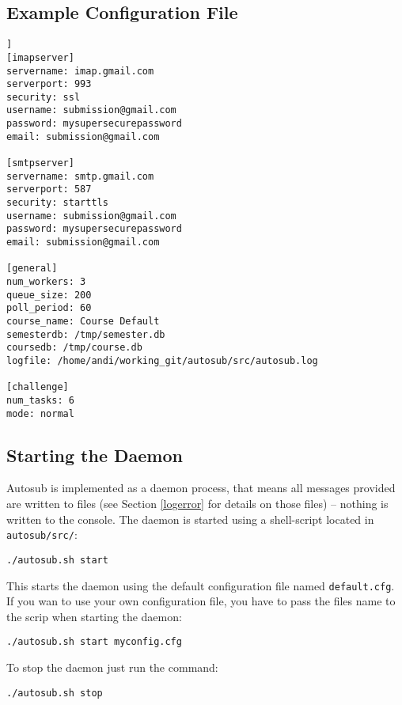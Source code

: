 \newpage

\subsection{Example Configuration File} \label{sub:exampleconfig}

\begin{lstlisting}[frame=single,captionpos=b,caption=example.cfg, belowcaptionskip=4pt]]
[imapserver]
servername: imap.gmail.com
serverport: 993
security: ssl
username: submission@gmail.com
password: mysupersecurepassword
email: submission@gmail.com

[smtpserver]
servername: smtp.gmail.com
serverport: 587
security: starttls
username: submission@gmail.com
password: mysupersecurepassword
email: submission@gmail.com

[general]
num_workers: 3
queue_size: 200
poll_period: 60
course_name: Course Default
semesterdb: /tmp/semester.db
coursedb: /tmp/course.db
logfile: /home/andi/working_git/autosub/src/autosub.log

[challenge]
num_tasks: 6
mode: normal
\end{lstlisting}

\subsection{Starting the Daemon}

Autosub is implemented as a daemon process, that means all messages provided are written
to files (see Section \ref{logerror} for details on those files) -- nothing is written to
the console. The daemon is started using a shell-script located in {\tt autosub/src/}:

\begin{verbatim}
./autosub.sh start
\end{verbatim}

This starts the daemon using the default configuration file named {\tt default.cfg}. If you
wan to use your own configuration file, you have to pass the files name to the scrip when
starting the daemon:

\begin{verbatim}
./autosub.sh start myconfig.cfg
\end{verbatim}

To stop the daemon just run the command:

\begin{verbatim}
./autosub.sh stop
\end{verbatim}

